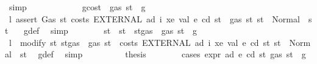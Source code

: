 \begin{isabellebody}
\ simp\isanewline
\ \ \ \ \isamarkupfalse%
\isanewline
\ \ \ \ \ \ \isamarkupfalse%
\ gcost{\isacharcolon}{\kern0pt}\ {\isachardoublequoteopen}{\isasymnot}\ gas\ st\ {\isasymle}\ g{\isachardoublequoteclose}\isanewline
\ \ \ \ \ \ \isamarkupfalse%
\ \isamarkupfalse%
\ l{}{\isacharcolon}{\kern0pt}\ {\isachardoublequoteopen}assert\ Gas\ {\isacharparenleft}{\kern0pt}{\isasymlambda}st{\isachardot}{\kern0pt}\ costs\ {\isacharparenleft}{\kern0pt}EXTERNAL\ ad\ i\ xe\ val{\isacharparenright}{\kern0pt}\ e\ cd\ st\ {\isacharless}{\kern0pt}\ gas\ st{\isacharparenright}{\kern0pt}\ st\ {\isacharequal}{\kern0pt}\ Normal\ {\isacharparenleft}{\kern0pt}{\isacharparenleft}{\kern0pt}{\isacharparenright}{\kern0pt}{\isacharcomma}{\kern0pt}\ st{\isacharparenright}{\kern0pt}\ {\isachardoublequoteclose}\ \isamarkupfalse%
\ g{\isacharunderscore}{\kern0pt}def\ \isamarkupfalse%
\ simp\isanewline
\ \ \ \ \ \ \isamarkupfalse%
\ st{\isacharprime}{\kern0pt}\ \ {\isachardoublequoteopen}st{\isacharprime}{\kern0pt}\ {\isacharequal}{\kern0pt}\ st{\isasymlparr}gas\ {\isacharcolon}{\kern0pt}{\isacharequal}{\kern0pt}\ gas\ st\ {\isacharminus}{\kern0pt}\ g{\isasymrparr}{\isachardoublequoteclose}\isanewline
\ \ \ \ \ \ \isamarkupfalse%
\ \isamarkupfalse%
\ l{}{\isacharcolon}{\kern0pt}\ {\isachardoublequoteopen}\ modify\ {\isacharparenleft}{\kern0pt}{\isasymlambda}st{\isachardot}{\kern0pt}\ st{\isasymlparr}gas\ {\isacharcolon}{\kern0pt}{\isacharequal}{\kern0pt}\ gas\ st\ {\isacharminus}{\kern0pt}\ costs\ {\isacharparenleft}{\kern0pt}EXTERNAL\ ad\ i\ xe\ val{\isacharparenright}{\kern0pt}\ e\ cd\ st{\isasymrparr}{\isacharparenright}{\kern0pt}\ st\ {\isacharequal}{\kern0pt}\ Normal\ {\isacharparenleft}{\kern0pt}{\isacharparenleft}{\kern0pt}{\isacharparenright}{\kern0pt}{\isacharcomma}{\kern0pt}\ st{\isacharprime}{\kern0pt}{\isacharparenright}{\kern0pt}{\isachardoublequoteclose}\ \isamarkupfalse%
\ g{\isacharunderscore}{\kern0pt}def\ \isamarkupfalse%
\ simp\isanewline
\ \ \ \ \ \ \isamarkupfalse%
\ \isamarkupfalse%
\ {\isacharquery}{\kern0pt}thesis\isanewline
\ \ \ \ \ \ \isamarkupfalse%
\ {\isacharparenleft}{\kern0pt}cases\ {\isachardoublequoteopen}expr\ ad\ e\ cd\ st{\isacharprime}{\kern0pt}\ {\isacharparenleft}{\kern0pt}gas\ st\ {\isacharminus}{\kern0pt}\ g{\isacharparenright}{\kern0pt}{\isachardoublequoteclose}{\isacharparenright}{\kern0pt}\isanewline

\end{isabellebody}
